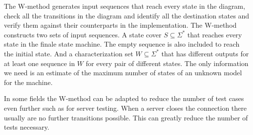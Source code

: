 \documentclass[multi,crop=false,class=article]{standalone}
\begin{document}
The W-method generates input sequences that reach every state in the diagram, check all the transitions in the diagram and identify all the destination states and verify them against their counterparts in the implementation\cite{Ipate07}.
The W-method constructs two sets of input sequences.
A state cover $S \subseteq \Sigma^{*}$ that reaches every state in the finale state machine.
The empty sequence is also included to reach the initial state.
And a characterization set $W \subseteq \Sigma^{*}$ that has different outputs for at least one sequence in $W$ for every pair of different states.
The only information we need is an estimate of the maximum number of states of an unknown model for the machine.

In some fields the W-method can be adapted to reduce the number of test cases even further such as for server testing.
When a server closes the connection there usually are no further transitions possible.
This can greatly reduce the number of tests necessary\cite{deRuiter15}.
\end{document}

